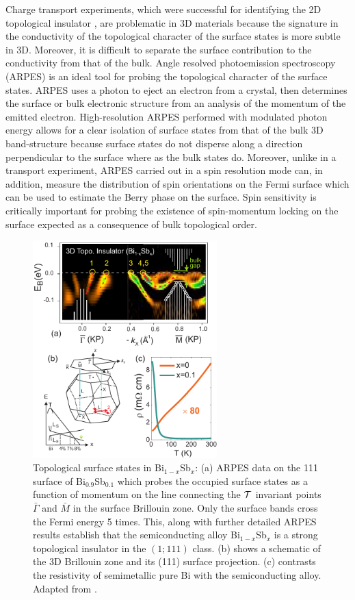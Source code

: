 \documentclass[twocolumn,floatfix,showpacs,rmp,aps]{revtex4}
\begin{document}
	Charge transport experiments,
	which were successful for identifying the 2D topological
	insulator \cite{konig07}, are problematic in 3D materials because
	the signature in the conductivity
	of the topological character of the surface states is more subtle in 3D.
	Moreover, it is difficult to separate the surface contribution to the conductivity
	from that of the bulk.
	Angle resolved photoemission spectroscopy (ARPES) is an ideal tool for probing
	the topological character of the surface states.
	ARPES uses a photon to eject an electron from a
	crystal, then determines the surface or bulk electronic structure
	from an analysis of the momentum of the emitted electron.
	High-resolution ARPES performed with
	modulated photon energy allows for a clear isolation of surface
	states from that of the bulk 3D band-structure because surface states
	do not disperse along a direction perpendicular to the surface where
	as the bulk states do. Moreover, unlike in a transport experiment,
	ARPES carried out in a spin resolution mode can, in addition, measure
	the distribution of spin orientations on the Fermi surface which can
	be used to estimate the Berry phase on the surface. Spin
	sensitivity is critically important for probing the existence of
	spin-momentum locking on the surface expected as a consequence of
	bulk topological order.
	
	\begin{figure}
		\includegraphics[width=2.8in]{Fig9}%
		\caption{Topological surface states in
			Bi$_{1-x}$Sb$_{x}$:  (a) ARPES data on the 111 surface of
			Bi$_{0.9}$Sb$_{0.1}$ which probes
			the occupied surface states as a function of momentum on the line connecting
			the ${\cal T}$ invariant points $\bar\Gamma$ and $\bar M$ in the surface Brillouin
			zone.  Only the surface bands cross the Fermi energy 5 times.  This, along with
			further detailed ARPES results \cite{hsieh08} establish that the semiconducting
			alloy Bi$_{1-x}$Sb$_{x}$ is a strong topological insulator in the $(1;111)$
			class.  (b) shows a schematic of the 3D Brillouin zone and its (111) surface
			projection.  (c) contrasts the resistivity of semimetallic pure Bi with
			the semiconducting alloy.  Adapted from .}
		\label{fig:zfig1} \end{figure}
	
\end{document}
